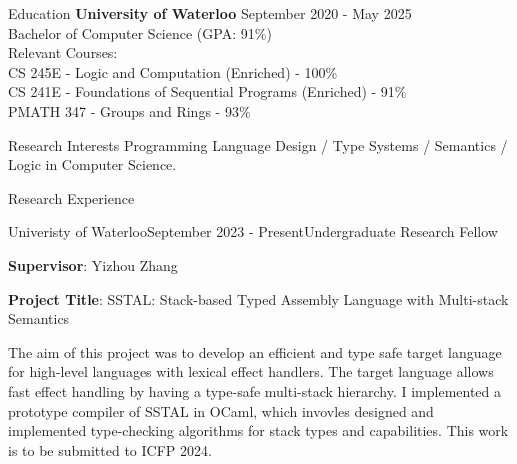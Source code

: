 \documentclass[
	12pt, %
]{resume} %
\begin{document}

\begin{rSection}{Education}
	\textbf{University of Waterloo} \hfill {September 2020 - May 2025} \\ 
	Bachelor of Computer Science (GPA: 91\%) \\
    Relevant Courses: \\
    \hspace*{5mm} CS 245E - Logic and Computation (Enriched) - 100\% \\
    \hspace*{5mm} CS 241E - Foundations of Sequential Programs (Enriched) - 91\% \\
    \hspace*{5mm} PMATH 347 - Groups and Rings - 93\% 
\end{rSection}

\begin{rSection}{Research Interests}
	Programming Language Design / Type Systems / Semantics / Logic in Computer Science.
\end{rSection}

\begin{rSection}{Research Experience}
	\begin{rSubsection}{Univeristy of Waterloo}{September 2023 - Present}{Undergraduate Research Fellow}{}
		\item \textbf{Supervisor}: Yizhou Zhang
		\item \textbf{Project Title}: SSTAL: Stack-based Typed Assembly Language with Multi-stack Semantics
		\item The aim of this project was to develop an efficient and type safe target language for high-level languages with lexical effect handlers.
		The target language allows fast effect handling by having a type-safe multi-stack hierarchy.
		I implemented a prototype compiler of SSTAL in OCaml, which invovles designed and implemented type-checking algorithms for stack types and capabilities.
		This work is to be submitted to ICFP 2024.
	\end{rSubsection}
\end{rSection}

\end{document}
